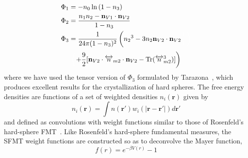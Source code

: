 \documentclass[letterpaper,twocolumn,amsmath,amssymb,prb]{revtex4-1}
\begin{document}
\begin{align}
\Phi_1 &= -n_0 \ln\left( 1 - n_3\right)\\
\Phi_2 &= \frac{n_1 n_2 - \mathbf{n}_{V1}\cdot\mathbf{n}_{V2}}{1-n_3} \\
\Phi_3 &= \frac{1}{24\pi(1-n_3)^2}\left({n_2}^3-3n_2\mathbf{n}_{V2}
\cdot\mathbf{n}_{V2}\color{white}\frac{1}{1}\right)\color{black}
\label{eq:sfmt-phi3}
\end{align}
\begin{displaymath}\color{white}\left(\color{black}+\frac{9}{2}
[\mathbf{n}_{V2}\cdot{\overleftrightarrow{n}_{m2}}\cdot{\mathbf{n}_{V2}}-
\operatorname{Tr}({\overleftrightarrow{n}^3_{m2}})]\right)\end{displaymath}
where we have used the tensor version of $\Phi_3$ formulated by 
Tarazona~\cite{tarazona2000,santos2012phi3}, which produces excellent
results for the crystallization of hard spheres.
The free energy densities are functions of a set of weighted densities $n_{i}(\textbf{r})$ 
given by %
\begin{equation}
  n_{i}(\textbf{r}) = \int
  n(\textbf{r}')w_i(|\textbf{r}-\textbf{r}'|) d\textbf{r}'
  \label{eq:n-convolution}
\end{equation}
and defined as convolutions with weight 
functions similar to those of 
Rosenfeld's hard-sphere FMT~\cite{rosenfeld1989}. 
Like Rosenfeld's hard-sphere fundamental measures, the SFMT weight
functions are constructed so as to deconvolve the Mayer function,
\begin{equation}
  f(r) = e^{-\beta V(r)} - 1
  \label{eq:Mayerfunction}
\end{equation}
\end{document}

